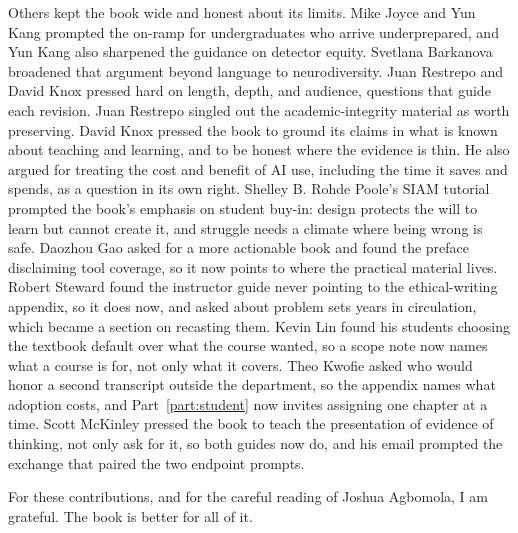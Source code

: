 \documentclass{SIAMbook2023}
\begin{document}
Others kept the book wide and honest about its limits. Mike Joyce and Yun Kang prompted the on-ramp for undergraduates who arrive underprepared, and Yun Kang also sharpened the guidance on detector equity. Svetlana Barkanova broadened that argument beyond language to neurodiversity. Juan Restrepo and David Knox pressed hard on length, depth, and audience, questions that guide each revision. Juan Restrepo singled out the academic-integrity material as worth preserving. David Knox pressed the book to ground its claims in what is known about teaching and learning, and to be honest where the evidence is thin. He also argued for treating the cost and benefit of AI use, including the time it saves and spends, as a question in its own right. Shelley B. Rohde Poole's SIAM tutorial prompted the book's emphasis on student buy-in: design protects the will to learn but cannot create it, and struggle needs a climate where being wrong is safe. Daozhou Gao asked for a more actionable book and found the preface disclaiming tool coverage, so it now points to where the practical material lives. Robert Steward found the instructor guide never pointing to the ethical-writing appendix, so it does now, and asked about problem sets years in circulation, which became a section on recasting them. Kevin Lin found his students choosing the textbook default over what the course wanted, so a scope note now names what a course is for, not only what it covers. Theo Kwofie asked who would honor a second transcript outside the department, so the appendix names what adoption costs, and Part~\ref{part:student} now invites assigning one chapter at a time. Scott McKinley pressed the book to teach the presentation of evidence of thinking, not only ask for it, so both guides now do, and his email prompted the exchange that paired the two endpoint prompts.

For these contributions, and for the careful reading of Joshua Agbomola, I am grateful. The book is better for all of it.


\newpage
\setcounter{tocdepth}{1}
\tableofcontents
\end{document}
